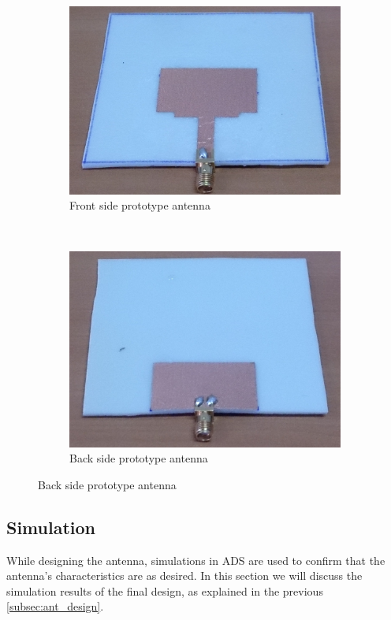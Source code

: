\documentclass[a4paper]{article}        %
\begin{document}
	\begin{figure}[H]
	\centering
	\begin{subfigure}[b]{0.52\textwidth}
                \includegraphics[width=\textwidth]{images/patch_proto_front}
                \caption{Front side prototype antenna}
                \label{fig:front_prototype}
        \end{subfigure}%
  ~      
        \begin{subfigure}[b]{0.5\textwidth}
                \includegraphics[width=\textwidth]{images/patch_proto_back}
                \caption{Back side prototype antenna}
                \label{fig:back_prototype}
        \end{subfigure}
	\end{figure}

	\subsection{Simulation}
		While designing the antenna, simulations in ADS are used to confirm that the antenna's characteristics are as desired. In this section we will discuss the simulation results of the final design, as explained in the previous \autoref{subsec:ant_design}. 
\end{document}
